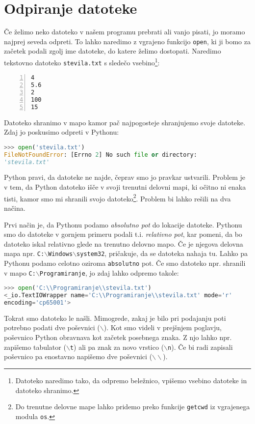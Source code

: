 \section{Odpiranje datoteke}

Če želimo neko datoteko v našem programu prebrati ali vanjo pisati, jo moramo najprej seveda odpreti. To lahko naredimo z vgrajeno funkcijo \texttt{open}, ki ji bomo za začetek podali zgolj ime datoteke, do katere želimo dostopati. Naredimo tekstovno datoteko \texttt{stevila.txt} s sledečo vsebino\footnote{Datoteko naredimo tako, da odpremo beležnico, vpišemo vsebino datoteke in datoteko shranimo.}:
\begin{lstlisting}[showstringspaces=false,numbers=left]
4
5.6
2
100
15
\end{lstlisting}
Datoteko shranimo v mapo kamor pač najpogosteje shranjujemo svoje datoteke. Zdaj jo poskusimo odpreti v Pythonu:
\begin{lstlisting}[language=Python, showstringspaces=false]
>>> open('stevila.txt')
FileNotFoundError: [Errno 2] No such file or directory: 
'stevila.txt'
\end{lstlisting}
Python pravi, da datoteke ne najde, čeprav smo jo pravkar ustvarili. Problem je v tem, da Python datoteko išče v svoji trenutni delovni mapi, ki očitno ni enaka tisti, kamor smo mi shranili svojo datoteko\footnote{Do trenutne delovne mape lahko pridemo preko funkcije \texttt{getcwd} iz vgrajenega modula \texttt{os}.}. Problem bi lahko rešili na dva načina.

Prvi način je, da Pythonu podamo \emph{absolutno pot} do lokacije datoteke. Pythonu smo do datoteke v gornjem primeru podali t.i. \emph{relativno pot}, kar pomeni, da bo datoteko iskal relativno glede na trenutno delovno mapo. Če je njegova delovna mapa npr. \texttt{C:$\backslash$Windows$\backslash$system32}, pričakuje, da se datoteka nahaja tu. Lahko pa Pythonu podamo celotno oziroma \texttt{absolutno} pot. Če smo datoteko npr. shranili v mapo \texttt{C:$\backslash$Programiranje}, jo zdaj lahko odpremo takole:
\begin{lstlisting}[language=Python, showstringspaces=false]
>>> open('C:\\Programiranje\\stevila.txt')
<_io.TextIOWrapper name='C:\\Programiranje\\stevila.txt' mode='r'
encoding='cp65001'>
\end{lstlisting}
Tokrat smo datoteko le našli. Mimogrede, zakaj je bilo pri podajanju poti potrebno podati dve poševnici (\texttt{$\backslash$}). Kot smo videli v prejšnjem poglavju, poševnico Python obravnava kot začetek posebnega znaka. Z njo lahko npr. zapišemo tabulator (\texttt{$\backslash$t}) ali pa znak za novo vrstico (\texttt{$\backslash$n}). Če bi radi zapisali poševnico pa enostavno napišemo dve poševnici (\texttt{$\backslash\backslash$}).

